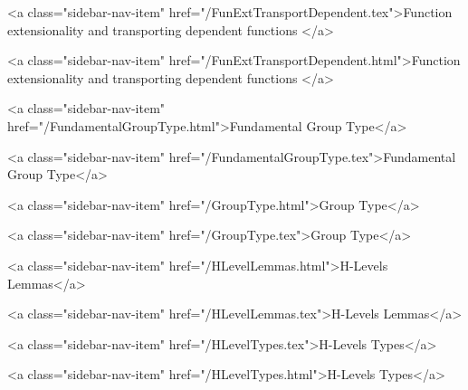       
    
      
        
          <a class="sidebar-nav-item" href="/FunExtTransportDependent.tex">Function extensionality and transporting dependent functions </a>
        
      
    
      
        
          <a class="sidebar-nav-item" href="/FunExtTransportDependent.html">Function extensionality and transporting dependent functions </a>
        
      
    
      
        
          <a class="sidebar-nav-item" href="/FundamentalGroupType.html">Fundamental Group Type</a>
        
      
    
      
        
          <a class="sidebar-nav-item" href="/FundamentalGroupType.tex">Fundamental Group Type</a>
        
      
    
      
        
          <a class="sidebar-nav-item" href="/GroupType.html">Group Type</a>
        
      
    
      
        
          <a class="sidebar-nav-item" href="/GroupType.tex">Group Type</a>
        
      
    
      
        
          <a class="sidebar-nav-item" href="/HLevelLemmas.html">H-Levels Lemmas</a>
        
      
    
      
        
          <a class="sidebar-nav-item" href="/HLevelLemmas.tex">H-Levels Lemmas</a>
        
      
    
      
        
          <a class="sidebar-nav-item" href="/HLevelTypes.tex">H-Levels Types</a>
        
      
    
      
        
          <a class="sidebar-nav-item" href="/HLevelTypes.html">H-Levels Types</a>
        
      
    
      
        
